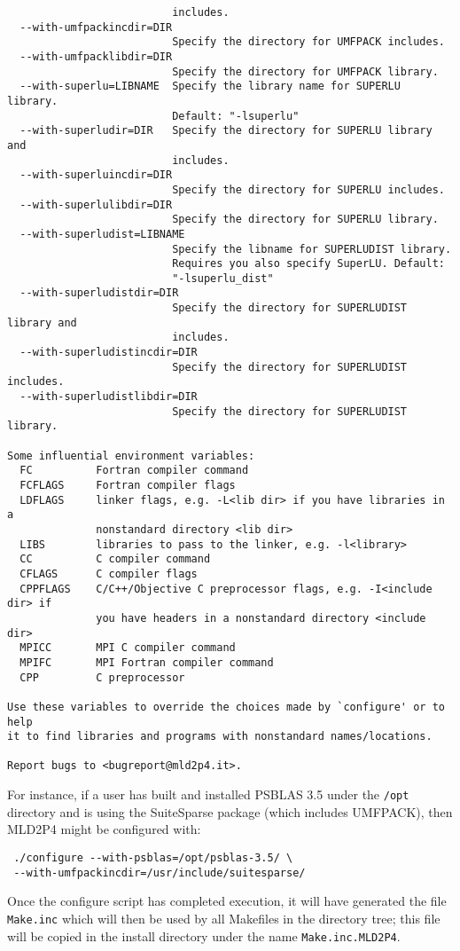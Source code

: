 \begin{verbatim}
                          includes.
  --with-umfpackincdir=DIR
                          Specify the directory for UMFPACK includes.
  --with-umfpacklibdir=DIR
                          Specify the directory for UMFPACK library.
  --with-superlu=LIBNAME  Specify the library name for SUPERLU library.
                          Default: "-lsuperlu"
  --with-superludir=DIR   Specify the directory for SUPERLU library and
                          includes.
  --with-superluincdir=DIR
                          Specify the directory for SUPERLU includes.
  --with-superlulibdir=DIR
                          Specify the directory for SUPERLU library.
  --with-superludist=LIBNAME
                          Specify the libname for SUPERLUDIST library.
                          Requires you also specify SuperLU. Default:
                          "-lsuperlu_dist"
  --with-superludistdir=DIR
                          Specify the directory for SUPERLUDIST library and
                          includes.
  --with-superludistincdir=DIR
                          Specify the directory for SUPERLUDIST includes.
  --with-superludistlibdir=DIR
                          Specify the directory for SUPERLUDIST library.

Some influential environment variables:
  FC          Fortran compiler command
  FCFLAGS     Fortran compiler flags
  LDFLAGS     linker flags, e.g. -L<lib dir> if you have libraries in a
              nonstandard directory <lib dir>
  LIBS        libraries to pass to the linker, e.g. -l<library>
  CC          C compiler command
  CFLAGS      C compiler flags
  CPPFLAGS    C/C++/Objective C preprocessor flags, e.g. -I<include dir> if
              you have headers in a nonstandard directory <include dir>
  MPICC       MPI C compiler command
  MPIFC       MPI Fortran compiler command
  CPP         C preprocessor

Use these variables to override the choices made by `configure' or to help
it to find libraries and programs with nonstandard names/locations.

Report bugs to <bugreport@mld2p4.it>.
\end{verbatim}

For instance, if a user has built and installed PSBLAS 3.5 under the
\verb|/opt| directory and is
using the SuiteSparse package (which includes UMFPACK), then MLD2P4
might be configured with:
\begin{verbatim}
 ./configure --with-psblas=/opt/psblas-3.5/ \
 --with-umfpackincdir=/usr/include/suitesparse/
\end{verbatim}
Once the configure script has completed execution, it will have
generated the file \verb|Make.inc| which will then be used by all
Makefiles in the directory tree; this file will be copied in the
install directory under the name \verb|Make.inc.MLD2P4|.

